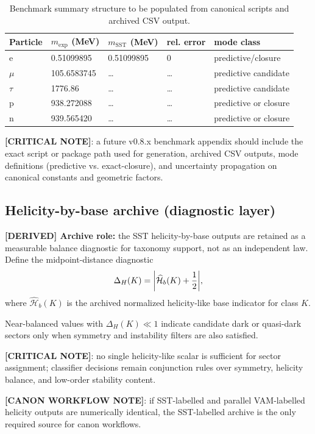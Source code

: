 \begin{table}[h]
\centering
\begin{tabular}{lllll}
\hline
Particle & $m_{\mathrm{exp}}$ (MeV) & $m_{\mathrm{SST}}$ (MeV) & rel. error & mode class \\
\hline
e & 0.51099895 & 0.51099895 & 0 & predictive/closure \\
$\mu$ & 105.6583745 & \dots & \dots & predictive candidate \\
$\tau$ & 1776.86 & \dots & \dots & predictive candidate \\
p & 938.272088 & \dots & \dots & predictive or closure \\
n & 939.565420 & \dots & \dots & predictive or closure \\
\hline
\end{tabular}
\caption{Benchmark summary structure to be populated from canonical scripts and archived CSV output.}
\end{table}

\textbf{[CRITICAL NOTE]}: a future v0.8.x benchmark appendix should include the exact script or package path used for generation, archived CSV outputs, mode definitions (predictive vs. exact-closure), and uncertainty propagation on canonical constants and geometric factors.

\subsection{Helicity-by-base archive (diagnostic layer)}
\textbf{[DERIVED] Archive role:} the SST helicity-by-base outputs are retained as a measurable balance diagnostic for taxonomy support, not as an independent law.
Define the midpoint-distance diagnostic
\begin{align}
    \Delta_H(K)=\abs{\widehat{\mathcal{H}}_{b}(K)+\frac{1}{2}},
\end{align}
where $\widehat{\mathcal{H}}_{b}(K)$ is the archived normalized helicity-like base indicator for class $K$.

Near-balanced values with $\Delta_H(K)\ll 1$ indicate candidate dark or quasi-dark sectors only when symmetry and instability filters are also satisfied.

\textbf{[CRITICAL NOTE]}: no single helicity-like scalar is sufficient for sector assignment; classifier decisions remain conjunction rules over symmetry, helicity balance, and low-order stability content.

\textbf{[CANON WORKFLOW NOTE]}: if SST-labelled and parallel VAM-labelled helicity outputs are numerically identical, the SST-labelled archive is the only required source for canon workflows.


